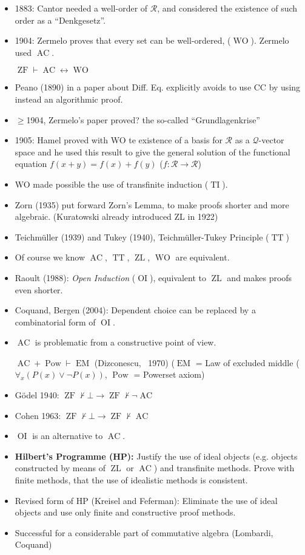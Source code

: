 \documentclass[headsepline=true,DIV=11]{scrartcl}
\theoremstyle{definition}
\newcommand{\WO}{\operatorname{WO}}
\newcommand{\AC}{\operatorname{AC}}
\newcommand{\ZF}{\operatorname{ZF}}
\newcommand{\TI}{\operatorname{TI}}
\newcommand{\TT}{\operatorname{TT}}
\newcommand{\ZL}{\operatorname{ZL}}
\newcommand{\OI}{\operatorname{OI}}
\newcommand{\Pow}{\operatorname{Pow}}
\newcommand{\EM}{\operatorname{EM}}
\begin{document}
\begin{itemize}
	\item 1883: Cantor needed a well-order of $\mathcal R$, and considered the existence of such order as a ``Denkgesetz''.
	\item 1904: Zermelo proves that every set can be well-ordered, ($\WO$). Zermelo used $\AC$.

		$\ZF\vdash\AC\leftrightarrow\WO$
	\item Peano (1890) in a paper about Diff. Eq. explicitly avoids to use CC by using instead an algorithmic proof.
	\item $\ge$1904, Zermelo's paper proved? the so-called ``Grundlagenkrise''
	\item 1905: Hamel proved with WO te existence of a basis for $\mathcal R$ as a $\mathcal Q$-vector space and he used this result to give the general solution of the functional equation $f(x+y)=f(x)+f(y)$ ($f\colon \mathcal R\to \mathcal R$)
	\item WO made possible the use of transfinite induction ($\TI$).
	\item Zorn (1935) put forward Zorn's Lemma, to make proofs shorter and more algebraic. (Kuratowski  already introduced ZL in 1922)
	\item Teichmüller (1939) and Tukey (1940), Teichmüller-Tukey Principle ($\TT$)
	\item Of course we know $\AC$, $\TT$, $\ZL$, $\WO$ are equivalent.
	\item Raoult (1988): {\em Open Induction} ($\OI$), equivalent to $\ZL$ and makes proofs even shorter.
	\item Coquand, Bergen (2004): Dependent choice can be replaced by a combinatorial form of $\OI$.
	\item $\AC$ is problematic from a constructive point of view. 

	$\AC + \Pow\vdash \EM$ (Dizconescu, ~1970) ($\EM$ = Law of excluded middle ($\forall_x (P(x)\lor\neg P(x))$, $\Pow$ = Powerset axiom)
	\item Gödel 1940: $\ZF \not\vdash \bot \to \ZF\not\vdash \neg \AC$
	\item Cohen 1963: $\ZF \not\vdash \bot \to \ZF\not\vdash \AC$
	\item $\OI$ is an alternative to $\AC$.
	\item {\bf Hilbert's Programme (HP):} Justify the use of ideal objects (e.g. objects constructed by means of $\ZL$ or $\AC$) and transfinite methods.
	Prove with finite methods, that the use of idealistic methods is consistent.
	\item Revised form of HP (Kreisel and Feferman): Eliminate the use of ideal objects and use only finite and constructive proof methods.
	\item Successful for a considerable part of commutative algebra (Lombardi, Coquand)
\end{itemize}
\end{document}
